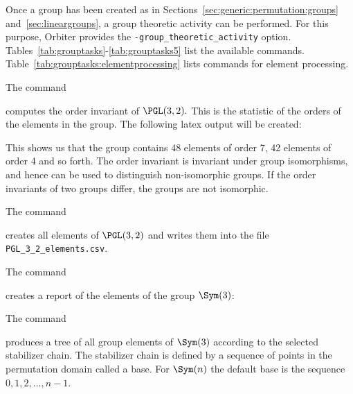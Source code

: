 
Once a group has been created as in 
Sections~\ref{sec:generic:permutation:groups} and~\ref{sec:lineargroups}, 
a group theoretic activity can be performed. 
For this purpose, Orbiter provides the \verb'-group_theoretic_activity' option. 
Tables~\ref{tab:grouptasks}-\ref{tab:grouptasks5} list the available commands.
Table~\ref{tab:grouptasks:elementprocessing} lists commands for element processing. 


\bigskip

The command


computes the order invariant of $\PGL(3,2).$ 
This is the statistic of the orders of the elements in the group. 
The following latex output will be created:



This shows us that the group contains 48 elements of order 7, 
42 elements of order 4 and so forth.
The order invariant is invariant under group isomorphisms, 
and hence can be used to distinguish non-isomorphic groups. 
If the order invariants of two groups differ, the groups are not isomorphic.

\bigskip


The command


creates all elements of $\PGL(3,2)$ 
and writes them into the file \verb'PGL_3_2_elements.csv'.

\bigskip


The command


creates a report of the elements of the group $\Sym(3)$: 


\bigskip


The command


produces a tree of all group elements of $\Sym(3)$ according to the selected stabilizer chain. 
The stabilizer chain is defined by a sequence of points in the permutation domain called a base.
For $\Sym(n)$ the default base is the sequence $0,1,2,\ldots,n-1.$


